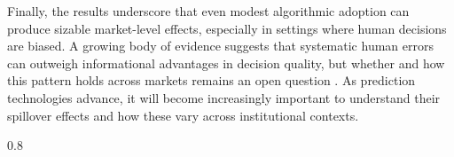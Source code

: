 \documentclass[11pt]{article}
\begin{document}
Finally, the results underscore that even modest algorithmic adoption can produce sizable market-level effects, especially in settings where human decisions are biased. A growing body of evidence suggests that systematic human errors can outweigh informational advantages in decision quality, but whether and how this pattern holds across markets remains an open question \citep{mullainathanbail2017, mullainathanobermeyer2019, rambachanIdentifyingPredictionMistakes, kahnemanNoiseFlawHuman2021}. As prediction technologies advance, it will become increasingly important to understand their spillover effects and how these vary across institutional contexts.
 


\clearpage
\begin{spacing}{0.8}
%

\end{spacing}






\end{document}
